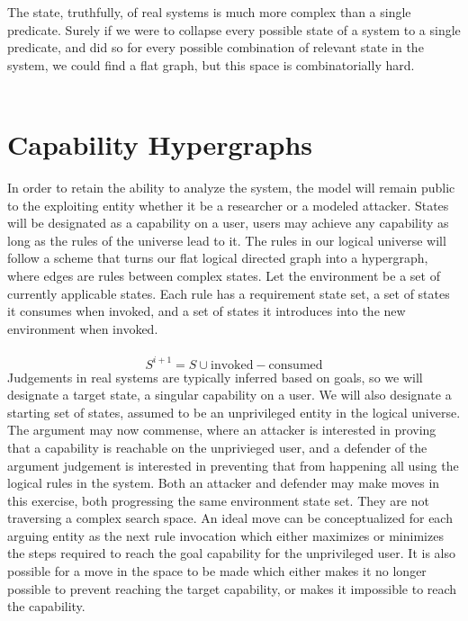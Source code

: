 \documentclass{article}
\begin{document}
	The state, truthfully, of real systems is much more complex than a single predicate. Surely if we were to collapse every possible state of a system to a single predicate, and did so for every possible combination of relevant state in the system, we could find a flat graph, but this space is combinatorially hard.\\\\
	\section{Capability Hypergraphs}
	In order to retain the ability to analyze the system, the model will remain public to the exploiting entity whether it be a researcher or a modeled attacker. States will be designated as a capability on a user, users may achieve any capability as long as the rules of the universe lead to it. The rules in our logical universe will follow a scheme that turns our flat logical directed graph into a hypergraph, where edges are rules between complex states. Let the environment be a set of currently applicable states. Each rule has a requirement state set, a set of states it consumes when invoked, and a set of states it introduces into the new environment when invoked.\\\\
	$$S^{i+1} = S \cup \text{invoked} - \text{consumed}$$
	Judgements in real systems are typically inferred based on goals, so we will designate a target state, a singular capability on a user. We will also designate a starting set of states, assumed to be an unprivileged entity in the logical universe. The argument may now commense, where an attacker is interested in proving that a capability is reachable on the unprivieged user, and a defender of the argument judgement is interested in preventing that from happening all using the logical rules in the system. Both an attacker and defender may make moves in this exercise, both progressing the same environment state set. They are not traversing a complex search space. An ideal move can be conceptualized for each arguing entity as the next rule invocation which either maximizes or minimizes the steps required to reach the goal capability for the unprivileged user. It is also possible for a move in the space to be made which either makes it no longer possible to prevent reaching the target capability, or makes it impossible to reach the capability. \\\\
\end{document}
